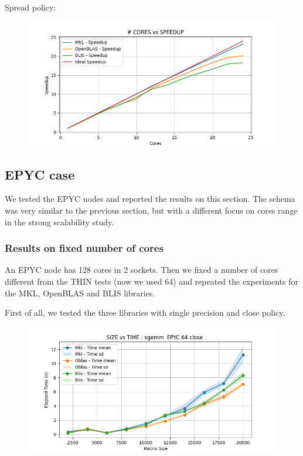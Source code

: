 \documentclass{article}
\begin{document}
Spread policy:
\begin{figure}[H]
    \centering
    \includegraphics[width=\textwidth]{THIN speedUp/dgemm_mkl.x_THIN_10000_spread_detailed__speedUp.png}
\end{figure}

\subsection{EPYC case}
We tested the EPYC nodes and reported the results on this section. The schema was very similar to the previous section, but with a different focus on cores range in the strong scalability study. 

\subsubsection{Results on fixed number of cores}
An EPYC node has 128 cores in 2 sockets. Then we fixed a number of cores different from the THIN tests (now we used 64) and repeated the experiments for the MKL, OpenBLAS and BLIS libraries.   

First of all, we tested the three libraries with single precision and close policy.
\begin{figure}[H]
    \centering
    \includegraphics[width=\textwidth]{EPYC 64/sgemm__EPYC_64_close_time.png}
\end{figure}
\end{document}
